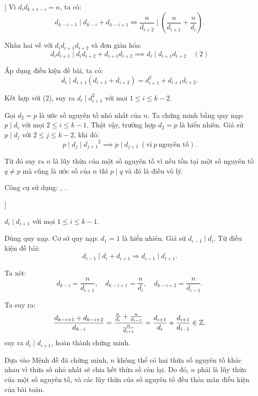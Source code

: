 \documentclass[../../divisors.tex]{subfiles}
\begin{document}
\begin{soln}[2\footnotemark[\value{footnote}]]
    Vì \( d_i d_{k+1-i} = n \), ta có:
    \[
        d_{k-i-1} \mid d_{k-i} + d_{k-i+1} \Longleftrightarrow \frac{n}{d_{i+2}} \mid \left( \frac{n}{d_{i+1}} + \frac{n}{d_i} \right).
    \]

    Nhân hai vế với \( d_i d_{i+1} d_{i+2} \) và đơn giản hóa:
    \[
        d_i d_{i+1} \mid d_i d_{i+2} + d_{i+1} d_{i+2} \implies d_i \mid d_{i+1} d_{i+2} \quad (2)
    \]
    
    Áp dụng điều kiện đề bài, ta có:
    \[
        d_i \mid d_{i+1} (d_{i+1} + d_{i+2}) = d_{i+1}^2 + d_{i+1} d_{i+2}.
    \]
    
    Kết hợp với (2), suy ra \( d_i \mid d_{i+1}^2 \) với mọi \( 1 \leq i \leq k - 2 \).
    
    Gọi \( d_2 = p \) là ước số nguyên tố nhỏ nhất của \( n \). Ta chứng minh bằng quy nạp: \( p \mid d_i \) với mọi \( 2 \leq i \leq k - 1 \).
    Thật vậy, trường hợp $d_2 = p$ là hiển nhiên. Giả sử $p \mid d_j$ với $2 \le j \le k-2$, khi đó:
    \[
        p \mid d_j \mid {d_{j+1}}^2 \implies p \mid d_{j+1}\ (\text{vì}\ p\ \text{nguyên tố}). 
    \]

    Từ đó suy ra \( n \) là lũy thừa của một số nguyên tố vì nếu tồn tại một số nguyên tố $q \ne p$ mà cũng là ước số của $n$ thì $p\mid q$ và đó là điều vô lý.
\end{soln}

\begin{remark*}
    Công cụ sử dụng: , .
\end{remark*}
    
\begin{soln}[3\footnotemark[\value{footnote}]]
    \begin{claim*}
        \( d_i \mid d_{i+1} \) với mọi \( 1 \leq i \leq k-1 \).
    \end{claim*}
    \begin{subproof}
        Dùng quy nạp. Cơ sở quy nạp: \( d_1 = 1 \) là hiển nhiên. Giả sử \( d_{i-1} \mid d_i \). Từ điều kiện đề bài:
        \[
            d_{i-1} \mid d_i + d_{i+1} \Rightarrow d_{i-1} \mid d_{i+1}.
        \]
        
        Ta xét:
        \[
            d_{k-i} = \frac{n}{d_{i+1}}, \quad d_{k-i+1} = \frac{n}{d_i}, \quad d_{k-i+2} = \frac{n}{d_{i-1}}.
        \]
        
        Ta suy ra:
        \[
            \frac{d_{k-i+1} + d_{k-i+2}}{d_{k-i}} = \frac{\frac{n}{d_i} + \frac{n}{d_{i-1}}}{\frac{n}{d_{i+1}}} = \frac{d_{i+1}}{d_i} + \frac{d_{i+1}}{d_{i-1}} \in \mathbb Z.
        \]
        suy ra \( d_i \mid d_{i+1} \), hoàn thành chứng minh.
    \end{subproof}

    Dựa vào Mệnh đề đã chứng minh, \( n \) không thể có hai thừa số nguyên tố khác nhau vì thừa số nhỏ nhất sẽ chia hết thừa số còn lại.
    Do đó, \( n \) phải là lũy thừa của một số nguyên tố, và các lũy thừa của số nguyên tố đều thỏa mãn điều kiện của bài toán.
\end{soln}
\end{document}
